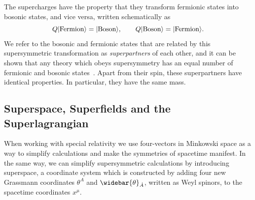 The supercharges have the property that they transform fermionic states into bosonic states, and vice versa, written schematically as
\begin{equation}
    Q \lvert\text{Fermion}\rangle = \lvert\text{Boson}\rangle, \qquad Q\lvert\text{Boson}\rangle = \lvert\text{Fermion}\rangle.
\end{equation}
We refer to the bosonic and fermionic states that are related by this supersymmetric transformation as \emph{superpartners} of each other, and it can be shown that any theory which obeys supersymmetry has an equal number of fermionic and bosonic states~\cite{Tong:susy}.
Apart from their spin, these superpartners have identical properties. In particular, they have the same mass.



\subsection{Superspace, Superfields and the Superlagrangian}\label{sec:super_space_field_lagrange}
When working with special relativity we use four-vectors in Minkowski space as a way to simplify calculations and make the symmetries of spacetime manifest.
In the same way, we can simplify supersymmetric calculations by introducing superspace, a coordinate system which is constructed by adding four new Grassmann coordinates $\theta^A$ and $\widebar{\theta}_{\dot{A}}$, written as Weyl spinors, to the spacetime coordinates $x^\mu$.


